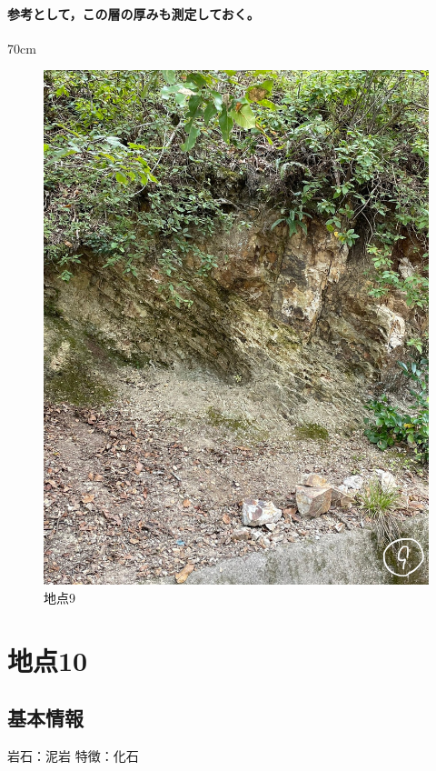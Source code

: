 \documentclass[uplatex,b5paper]{jsreport}
\begin{document}
      \paragraph{参考として，この層の厚みも測定しておく。}
      70cm
  \begin{figure}[h]
    \begin{center}
      \includegraphics[scale=0.1]{files/地学実習/地点9.jpg}
      \caption{地点9}
    \end{center}    
  \end{figure}
  \clearpage

  \section{地点10}
    \subsection{基本情報}
    岩石：泥岩
    特徴：化石
\end{document}
